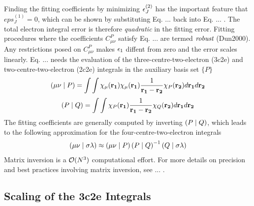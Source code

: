 \noindent Finding the fitting coefficients by minimizing $\epsilon_J^{(2)}$ has the important feature that $eps_J^{(1)} = 0$, which can be shown by substituting Eq. ... back into Eq. ... . The total electron integral error is therefore \emph{quadratic} in the fitting error. Fitting procedures where the coefficients $C^P_{\mu\nu}$ satisfy Eq. ... are termed $\emph{robust}$ (Dun2000). Any restrictions posed on $C^P_{\mu\nu}$ makes $\epsilon_{1}$ diffent from zero and the error scales linearly. 
Eq. ... needs the evaluation of the three-centre-two-electron (3c2e) and two-centre-two-electron (2c2e) integrals in the auxiliary basis set $\{P\}$
\begin{equation}
\left( \mu\nu \mid P \right) = \int \int \chi_{\mu}(\mathbf{r_1}) \chi_{\mu}(\mathbf{r_1}) \frac{1}{\mathbf{r_1} - \mathbf{r_2}} \chi_{P}(\mathbf{r_2}) d\mathbf{r_1} d\mathbf{r_2} 
\end{equation}
\begin{equation}
\left( P \mid Q \right) = \int \int \chi_{P}(\mathbf{r_1}) \frac{1}{\mathbf{r_1} - \mathbf{r_2}} \chi_{Q}(\mathbf{r_2}) d\mathbf{r_1} d\mathbf{r_2} 
\end{equation}
\noindent The fitting coefficients are generally computed by inverting $\left( P \mid Q \right)$, which leads to the following approximation for the four-centre-two-electron integrals
\begin{equation}
\left( \mu\nu \mid \sigma\lambda \right) \approx \left( \mu\nu \mid P \right) \left( P \mid Q \right)^{-1} \left( Q \mid \sigma\lambda \right)
\end{equation}
\noindent Matrix inversion is a $\mathcal{O}(N^{3})$ computational effort. For more details on precision and best practices involving matrix inversion, see ... .

\subsection{Scaling of the 3c2e Integrals}

